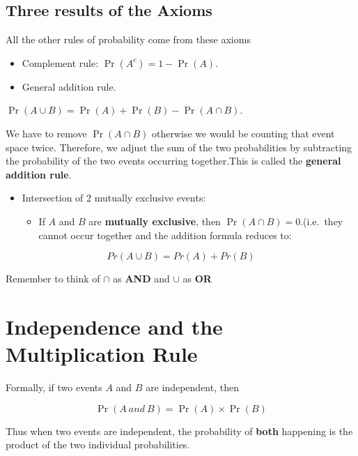 \documentclass[
  oneside]{krantz}
\providecommand{\tightlist}{%
  \setlength{\itemsep}{0pt}\setlength{\parskip}{0pt}}
\begin{document}
\hypertarget{three-results-of-the-axioms}{%
\subsection{Three results of the Axioms}\label{three-results-of-the-axioms}}

All the other rules of probability come from these axioms

\begin{itemize}
\item
  Complement rule: \(\Pr(A^c) = 1 - \Pr(A)\).
\item
  General addition rule.
\end{itemize}

\(\Pr(A \cup B) = \Pr(A) + \Pr(B) - \Pr(A \cap B)\).

We have to remove \(\Pr(A \cap B)\) otherwise we would be counting that event space twice. Therefore, we adjust the sum of the two probabilities by subtracting the probability of the two events occurring together.This is called the \textbf{general addition rule}.

\begin{itemize}
\item
  Intersection of 2 mutually exclusive events:

  \begin{itemize}
  \tightlist
  \item
    If \(A\) and \(B\) are \textbf{mutually exclusive}, then \(\Pr(A \cap B) = 0\).(i.e.~they cannot occur together and the addition formula reduces to:
  \end{itemize}
\end{itemize}

\[Pr(A \cup B) = Pr(A) + Pr(B)\]

Remember to think of \(\cap\) as \textbf{AND} and \(\cup\) as \textbf{OR}

\hypertarget{independence-and-the-multiplication-rule}{%
\section{Independence and the Multiplication Rule}\label{independence-and-the-multiplication-rule}}

Formally, if two events \(A\) and \(B\) are independent, then

\[\Pr(A ~and~ B) = \Pr(A) \times \Pr(B)\]

Thus when two events are independent, the probability of \textbf{both} happening is the product of the two individual probabilities.
\end{document}
